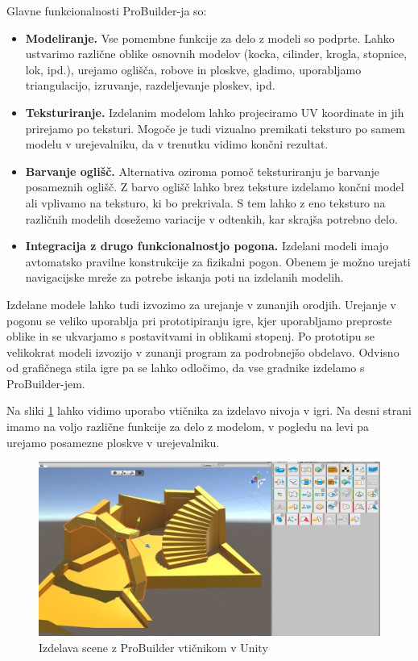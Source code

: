 \documentclass[12pt,a4paper,twoside]{book}
\begin{document}
Glavne funkcionalnosti ProBuilder-ja so:
\begin{itemize}
\item \textbf{Modeliranje.} Vse pomembne funkcije za delo z modeli so podprte. Lahko ustvarimo različne oblike osnovnih modelov (kocka, cilinder, krogla, stopnice, lok, ipd.), urejamo oglišča, robove in ploskve, gladimo, uporabljamo triangulacijo, izruvanje, razdeljevanje ploskev, ipd.
\item \textbf{Teksturiranje.} Izdelanim modelom lahko projeciramo UV koordinate in jih prirejamo po teksturi. Mogoče je tudi vizualno premikati teksturo po samem modelu v urejevalniku, da v trenutku vidimo končni rezultat.
\item \textbf{Barvanje oglišč.} Alternativa oziroma pomoč teksturiranju je barvanje posameznih oglišč. Z barvo oglišč lahko brez teksture izdelamo končni model ali vplivamo na teksturo, ki bo prekrivala. S tem lahko z eno teksturo na različnih modelih dosežemo variacije v odtenkih, kar skrajša potrebno delo.
\item \textbf{Integracija z drugo funkcionalnostjo pogona.} Izdelani modeli imajo avtomatsko pravilne konstrukcije za fizikalni pogon. Obenem je možno urejati navigacijske mreže za potrebe iskanja poti na izdelanih modelih.
\end{itemize}

Izdelane modele lahko tudi izvozimo za urejanje v zunanjih orodjih. Urejanje v pogonu se veliko uporablja pri prototipiranju igre, kjer uporabljamo preproste oblike in se ukvarjamo s postavitvami in oblikami stopenj. Po prototipu se velikokrat modeli izvozijo v zunanji program za podrobnejšo obdelavo. Odvisno od grafičnega stila igre pa se lahko odločimo, da vse gradnike izdelamo s ProBuilder-jem. 

Na sliki \ref{slika:probuilder} lahko vidimo uporabo vtičnika za izdelavo nivoja v igri. Na desni strani imamo na voljo različne funkcije za delo z modelom, v pogledu na levi pa urejamo posamezne ploskve v urejevalniku.

\begin{figure}[h]
	\centering
	\includegraphics[width=15cm]{probuilder}
	\caption{Izdelava scene z ProBuilder vtičnikom v Unity}
	\label{slika:probuilder}
\end{figure}
\end{document}
